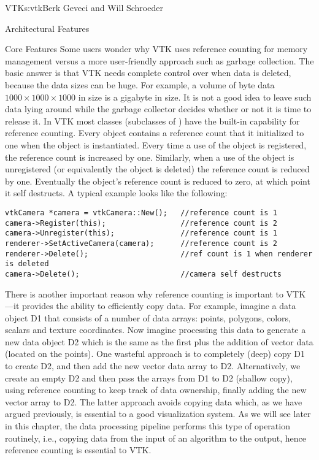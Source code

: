 \begin{aosachapter}{VTK}{s:vtk}{Berk Geveci and Will Schroeder}
\begin{aosasect1}{Architectural Features}
\begin{aosasect2}{Core Features}
Some users wonder why VTK uses reference counting for memory
management versus a more user-friendly approach such as garbage
collection. The basic answer is that VTK needs complete control over
when data is deleted, because the data sizes can be huge. For example,
a volume of byte data $1000{\times}1000{\times}1000$ in size is a
gigabyte in size. It is not a good idea to leave such data lying
around while the garbage collector decides whether or not it is time
to release it. In VTK most classes (subclasses of )
have the built-in capability for reference counting. Every object
contains a reference count that it initialized to one when the object
is instantiated.  Every time a use of the object is registered, the
reference count is increased by one. Similarly, when a use of the
object is unregistered (or equivalently the object is deleted) the
reference count is reduced by one. Eventually the object's reference
count is reduced to zero, at which point it self destructs.  A typical
example looks like the following:

\begin{verbatim}
vtkCamera *camera = vtkCamera::New();   //reference count is 1
camera->Register(this);                 //reference count is 2
camera->Unregister(this);               //reference count is 1
renderer->SetActiveCamera(camera);      //reference count is 2
renderer->Delete();                     //ref count is 1 when renderer is deleted
camera->Delete();                       //camera self destructs
\end{verbatim}

There is another important reason why reference counting is important
to VTK---it provides the ability to efficiently copy data. For
example, imagine a data object D1 that consists of a number of data
arrays: points, polygons, colors, scalars and texture coordinates. Now
imagine processing this data to generate a new data object D2 which is
the same as the first plus the addition of vector data (located on the
points). One wasteful approach is to completely (deep) copy D1 to
create D2, and then add the new vector data array to
D2. Alternatively, we create an empty D2 and then pass the arrays from
D1 to D2 (shallow copy), using reference counting to keep track of
data ownership, finally adding the new vector array to D2. The latter
approach avoids copying data which, as we have argued previously, is
essential to a good visualization system. As we will see later in this
chapter, the data processing pipeline performs this type of operation
routinely, i.e., copying data from the input of an algorithm to the
output, hence reference counting is essential to VTK.


\end{aosasect2}
\end{aosasect1}
\end{aosachapter}
